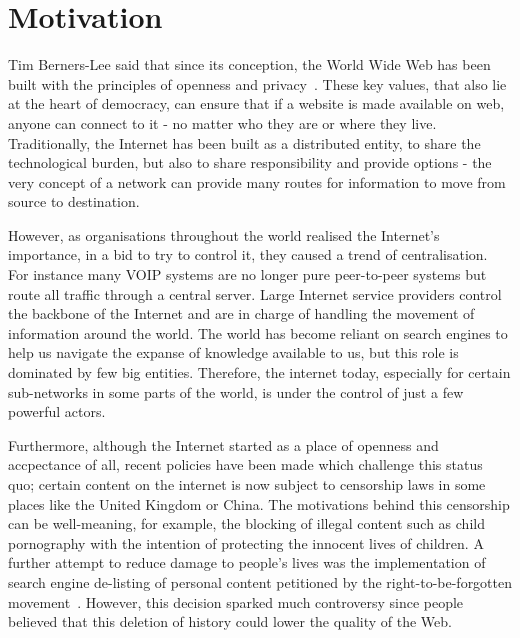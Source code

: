 \documentclass[ %
                    author={Samuel Russell},
                supervisor={Prof. Bogdan Warinschi},
                    degree={MEng},
                     title={Innocuous Ciphertexts},
                  subtitle={The DE-CENSOR Scheme},
                      type={research},
                      year={2018} ]{dissertation}
\begin{document}

\chapter{Motivation}
\label{chap:context}

Tim Berners-Lee said that since its conception, the World Wide Web has been built with the principles of openness and privacy~\cite{gard}.
These key values, that also lie at the heart of democracy, can ensure that if a website is made available on web, anyone can connect to it - no matter who they are or where they live. 
Traditionally, the Internet has been built as a distributed entity, to share the technological burden, but also to share responsibility and provide options - the very concept of a network can provide many routes for information to move from source to destination.

However, as organisations throughout the world realised the Internet's importance, in a bid to try to control it, they caused a trend of centralisation.
For instance many VOIP systems are no longer pure peer-to-peer systems but route all traffic through a central server.
Large Internet service providers control the backbone of the Internet and are in charge of handling the movement of information around the world.
The world has become reliant on search engines to help us navigate the expanse of knowledge available to us, but this role is dominated by few big entities.
Therefore, the internet today, especially for certain sub-networks in some parts of the world, is under the control of just a few powerful actors. 

Furthermore, although the Internet started as a place of openness and accpectance of all, recent policies have been made which challenge this status quo; certain content on the internet is now subject to censorship laws in some places like the United Kingdom or China. The motivations behind this censorship can be well-meaning, for example, the blocking of illegal content such as child pornography with the intention of protecting the innocent lives of children. A further attempt to reduce damage to people's lives was the implementation of search engine de-listing of personal content petitioned by the right-to-be-forgotten movement~\cite{rtbf}. However, this decision sparked much controversy since people believed that this deletion of history could lower the quality of the Web. 
\end{document}
